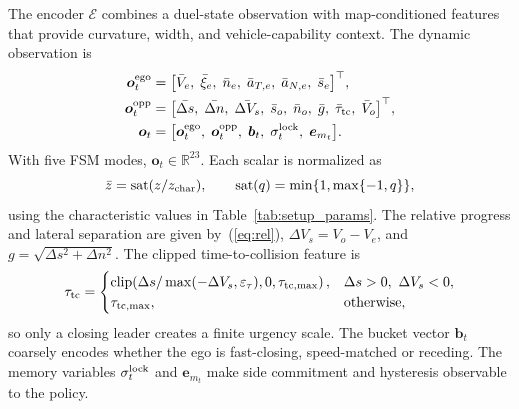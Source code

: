 \documentclass{iopjournal}
\begin{document}
The encoder $\mathcal{E}$ combines a duel-state observation with
map-conditioned features that provide curvature, width, and
vehicle-capability context.  The dynamic observation is
\begin{align}
\bm{o}_t^{\rm ego}
&=\bigl[
\bar V_e,\;\bar\xi_e,\;\bar n_e,\;\bar a_{T,e},\;\bar a_{N,e},\;\bar s_e
\bigr]^\top,
\label{eq:obs_ego}\\
\bm{o}_t^{\rm opp}
&=\bigl[
\bar{\Delta s},\;\bar{\Delta n},\;\bar{\Delta V_s},\;\bar s_o,\;\bar n_o,\;
\bar g,\;\bar\tau_{\rm tc},\;\bar V_o
\bigr]^\top ,
\label{eq:obs_opp}\\
\bm{o}_t
&=\bigl[
\bm{o}_t^{\rm ego},\;\bm{o}_t^{\rm opp},\;\bm{b}_t,\;
\sigma_t^{\rm lock},\;\bm{e}_{m_t}
\bigr].
\label{eq:obs}
\end{align}
With five FSM modes, $\bm{o}_t\in\mathbb{R}^{23}$.  Each scalar is normalized
as
\begin{equation}
\bar z=\operatorname{sat}(z/z_{\rm char}),\qquad
\operatorname{sat}(q)=\min\{1,\max\{-1,q\}\},
\label{eq:normalization}
\end{equation}
using the characteristic values in Table~\ref{tab:setup_params}.  The
relative progress and lateral separation are given by~(\ref{eq:rel}),
$\Delta V_s=V_o-V_e$, and $g=\sqrt{\Delta s^2+\Delta n^2}$.  The clipped
time-to-collision feature is
\begin{equation}
\tau_{\rm tc}=
\begin{cases}
\operatorname{clip}\!\left(\Delta s/\max(-\Delta V_s,\varepsilon_\tau),
0,\tau_{\rm tc,\max}\right), & \Delta s>0,\ \Delta V_s<0,\\
\tau_{\rm tc,\max}, & \text{otherwise},
\end{cases}
\label{eq:ttc}
\end{equation}
so only a closing leader creates a finite urgency scale.  The bucket vector
$\bm{b}_t$ coarsely encodes whether the ego is fast-closing, speed-matched or
receding.  The memory variables $\sigma_t^{\rm lock}$ and $\bm{e}_{m_t}$ make
side commitment and hysteresis observable to the policy.
\end{document}
